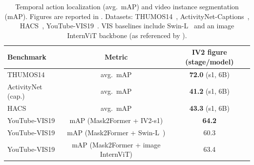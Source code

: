 \begin{enrichment}
\begin{enrichment}
        \begin{table}[H]
            \centering
            \caption{Temporal action localization (avg.\ mAP) and video instance segmentation (mAP). Figures are reported in \cite{wang2024_internvideo2}. Datasets: THUMOS14~\cite{jiang2014_thumos14}, ActivityNet-Captions~\cite{krishna2017_activitynet_captions}, HACS~\cite{zhao2019_hacs}, YouTube-VIS19~\cite{yang2019_youtube_vis}. VIS baselines include Swin-L~\cite{liu2021_swin} and an image InternViT backbone (as referenced by \cite{wang2024_internvideo2}).}
            \label{tab:iv2_action}
            \scriptsize
            \begin{tabular}{lcc}
                \hline
                \textbf{Benchmark} & \textbf{Metric} & \textbf{IV2 figure (stage/model)} \\
                \hline
                THUMOS14~\cite{jiang2014_thumos14} & avg.\ mAP & \textbf{72.0} (s1, 6B) \\
                ActivityNet (cap.)~\cite{krishna2017_activitynet_captions} & avg.\ mAP & \textbf{41.2} (s1, 6B) \\
                HACS~\cite{zhao2019_hacs} & avg.\ mAP & \textbf{43.3} (s1, 6B) \\
                \hline
                YouTube-VIS19~\cite{yang2019_youtube_vis} & mAP (Mask2Former + IV2-s1) & \textbf{64.2} \\
                YouTube-VIS19~\cite{yang2019_youtube_vis} & mAP (Mask2Former + Swin-L~\cite{liu2021_swin}) & 60.3 \\
                YouTube-VIS19~\cite{yang2019_youtube_vis} & mAP (Mask2Former + image InternViT) & 63.4 \\
                \hline
            \end{tabular}
        \end{table}
        

\end{enrichment}
\end{enrichment}
